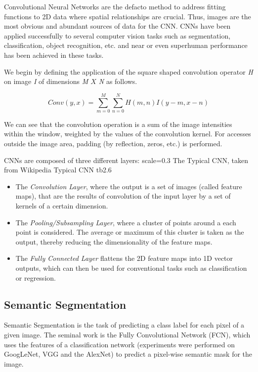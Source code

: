 Convolutional Neural Networks are the defacto method to address fitting functions to 2D data where spatial relationships are crucial. Thus, images are the most obvious and abundant sources of data for the CNN. CNNs have been applied successfully to several computer vision tasks such as segmentation, classification, object recognition, etc. and near or even superhuman performance has been achieved in these tasks.

We begin by defining the application of the square shaped convolution operator \emph{H} on image \emph{I} of dimensions \emph{M $X$ N} as follows.

\[Conv(y, x) = \sum_{m=0}^{M}\sum_{n=0}^{N}H(m, n)I(y-m, x-n)\]

We can see that the convolution operation is a sum of the image intensities within the window, weighted by the values of the convolution kernel. For accesses outside the image area, padding (by reflection, zeros, etc.) is performed.

CNNs are composed of three different layers: 
{scale=0.3}%
{The Typical CNN, taken from Wikipedia}%
{Typical CNN}%
{tb2.6} %

\begin{itemize}
	\item The \textit{Convolution Layer}, where the output is a set of images (called feature maps), that are the results of convolution of the input layer by a set of kernels of a certain dimension. \\
	\item The \textit{Pooling/Subsampling Layer}, where a cluster of points around a each point is considered. The average or maximum of this cluster is taken as the output, thereby reducing the dimensionality of the feature maps. \\ 
	\item The \textit{Fully Connected Layer} flattens the 2D feature maps into 1D vector outputs, which can then be used for conventional tasks such as classification or regression. 
\end{itemize}

\subsection{Semantic Segmentation}
Semantic Segmentation is the task of predicting a class label for each pixel of a given image. The seminal work is the Fully Convolutional Network (FCN), which uses the features of a classification network (experiments were performed on GoogLeNet, VGG and the AlexNet) to predict a pixel-wise semantic mask for the image. 

